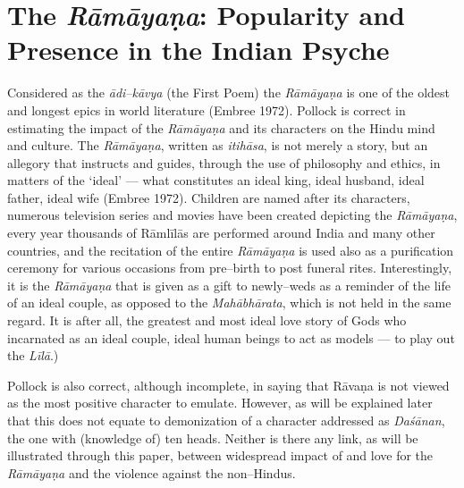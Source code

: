 \section*{The \textit{Rāmāyaṇa}: Popularity and Presence in the Indian Psyche}

Considered as the \textit{ādi–kāvya} (the First Poem) the \textit{Rāmāyaṇa} is one of the oldest and longest epics in world literature (Embree 1972). Pollock is correct in estimating the impact of the \textit{Rāmāyaṇa} and its characters on the Hindu mind and culture. The \textit{Rāmāyaṇa}, written as \textit{itihāsa}, is not merely a story, but an allegory that instructs and guides, through the use of philosophy and ethics, in matters of the ‘ideal’ — what constitutes an ideal king, ideal husband, ideal father, ideal wife (Embree 1972). Children are named after its characters, numerous television series and movies have been created depicting the \textit{Rāmāyaṇa}, every year thousands of Rāmlīlās are performed around India and many other countries, and the recitation of the entire \textit{Rāmāyaṇa} is used also as a purification ceremony for various occasions from pre–birth to post funeral rites. Interestingly, it is the \textit{Rāmāyaṇa} that is given as a gift to newly–weds as a reminder of the life of an ideal couple, as opposed to the \textit{Mahābhārata}, which is not held in the same regard. It is after all, the greatest and most ideal love story of Gods who incarnated as an ideal couple, ideal human beings to act as models — to play out the \textit{Līlā}.)

Pollock is also correct, although incomplete, in saying that Rāvaṇa is not viewed as the most positive character to emulate. However, as will be explained later that this does not equate to demonization of a character addressed as \textit{Daśānan}, the one with (knowledge of) ten heads. Neither is there any link, as will be illustrated through this paper, between widespread impact of and love for the \textit{Rāmāyaṇa} and the violence against the non–Hindus.


